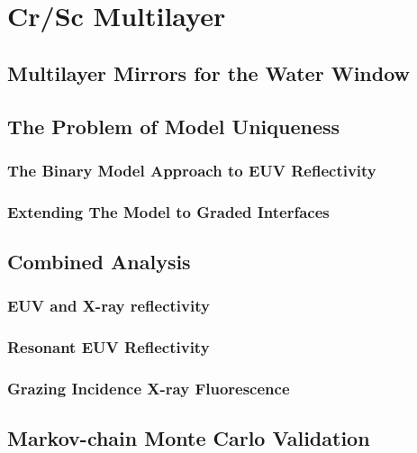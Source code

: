\chapter{Cr/Sc Multilayer}

\section{Multilayer Mirrors for the Water Window}

\section{The Problem of Model Uniqueness}
\subsection{The Binary Model Approach to EUV Reflectivity}
\subsection{Extending The Model to Graded Interfaces}

\section{Combined Analysis}
\subsection{EUV and X-ray reflectivity}
\subsection{Resonant EUV Reflectivity}
\subsection{Grazing Incidence X-ray Fluorescence}

\section{Markov-chain Monte Carlo Validation}
\cite{haase_multiparameter_2016}